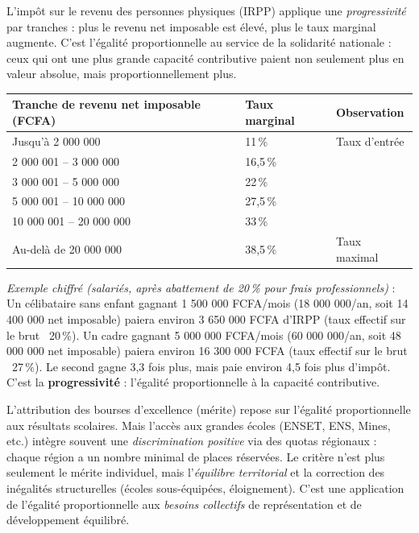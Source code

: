 \documentclass[11pt]{article}
\begin{document}
\begin{exemplebox}
L'impôt sur le revenu des personnes physiques (IRPP) applique une \emph{progressivité} par tranches : plus le revenu net imposable est élevé, plus le taux marginal augmente. C'est l'égalité proportionnelle au service de la solidarité nationale : ceux qui ont une plus grande capacité contributive paient non seulement plus en valeur absolue, mais proportionnellement plus.

\begin{center}
\begin{tabularx}{\linewidth}{|l|X|X|}\hline
\textbf{Tranche de revenu net imposable (FCFA)} & \textbf{Taux marginal} & \textbf{Observation} \\ \hline
Jusqu'à 2 000 000 & 11\,\% & Taux d'entrée \\ \hline
2 000 001 -- 3 000 000 & 16,5\,\% & \\ \hline
3 000 001 -- 5 000 000 & 22\,\% & \\ \hline
5 000 001 -- 10 000 000 & 27,5\,\% & \\ \hline
10 000 001 -- 20 000 000 & 33\,\% & \\ \hline
Au-delà de 20 000 000 & 38,5\,\% & Taux maximal \\ \hline
\end{tabularx}
\end{center}

\emph{Exemple chiffré (salariés, après abattement de 20\,\% pour frais professionnels)} : Un célibataire sans enfant gagnant 1 500 000 FCFA/mois (18 000 000/an, soit 14 400 000 net imposable) paiera environ 3 650 000 FCFA d'IRPP (taux effectif sur le brut ~20\,\%). Un cadre gagnant 5 000 000 FCFA/mois (60 000 000/an, soit 48 000 000 net imposable) paiera environ 16 300 000 FCFA (taux effectif sur le brut ~27\,\%). Le second gagne 3,3 fois plus, mais paie environ 4,5 fois plus d'impôt. C'est la \textbf{progressivité} : l'égalité proportionnelle à la capacité contributive.
\end{exemplebox}

\begin{exemplebox}
L'attribution des bourses d'excellence (mérite) repose sur l'égalité proportionnelle aux résultats scolaires. Mais l'accès aux grandes écoles (ENSET, ENS, Mines, etc.) intègre souvent une \emph{discrimination positive} via des quotas régionaux : chaque région a un nombre minimal de places réservées. Le critère n'est plus seulement le mérite individuel, mais l'\emph{équilibre territorial} et la correction des inégalités structurelles (écoles sous-équipées, éloignement). C'est une application de l'égalité proportionnelle aux \emph{besoins collectifs} de représentation et de développement équilibré.
\end{exemplebox}
\end{document}
